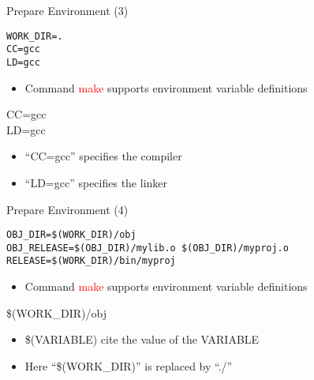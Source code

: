 \begin{frame}[fragile]{Prepare Environment (3)}
\lstset{language=[gnu] make}
\begin{lstlisting}[linewidth=0.9\linewidth, xleftmargin=0.05\linewidth, caption=Makefile]
WORK_DIR=.
CC=gcc
LD=gcc
\end{lstlisting}
\vspace{-0.2in}
\begin{itemize}
	\item {Command \textcolor{red}{make} supports environment variable definitions }
\end{itemize}
\begin{center}
	\Large{CC=gcc}\\
	\Large{LD=gcc}
\end{center}
\begin{itemize}
	\item {``CC=gcc'' specifies the compiler}
	\item {``LD=gcc'' specifies the linker}
\end{itemize}
\end{frame}

\begin{frame}[fragile]{Prepare Environment (4)}
\vspace{-0.1in}
\lstset{language=[gnu] make}
\begin{lstlisting}[linewidth=0.9\linewidth, xleftmargin=0.05\linewidth, caption=Makefile]
OBJ_DIR=$(WORK_DIR)/obj
OBJ_RELEASE=$(OBJ_DIR)/mylib.o $(OBJ_DIR)/myproj.o
RELEASE=$(WORK_DIR)/bin/myproj
\end{lstlisting}
\vspace{-0.2in}
\begin{itemize}
	\item {Command \textcolor{red}{make} supports environment variable definitions }
\end{itemize}
\begin{center}
	\Large{\$(WORK\_DIR)/obj}
\end{center}
\vspace{-0.2in}
\begin{itemize}
	\item {\$(VARIABLE) cite the value of the VARIABLE}
	\item {Here ``\$(WORK\_DIR)'' is replaced by ``./''}
\end{itemize}
\end{frame}



